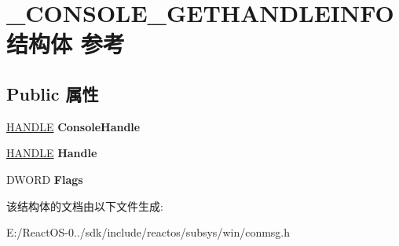 \hypertarget{struct___c_o_n_s_o_l_e___g_e_t_h_a_n_d_l_e_i_n_f_o}{}\section{\+\_\+\+C\+O\+N\+S\+O\+L\+E\+\_\+\+G\+E\+T\+H\+A\+N\+D\+L\+E\+I\+N\+F\+O结构体 参考}
\label{struct___c_o_n_s_o_l_e___g_e_t_h_a_n_d_l_e_i_n_f_o}
\subsection*{Public 属性}
\begin{DoxyCompactItemize}
\item 
\mbox{\label{struct___c_o_n_s_o_l_e___g_e_t_h_a_n_d_l_e_i_n_f_o_a83f7977c98e7216a0fd11a92f5338284}} 
\hyperlink{interfacevoid}{H\+A\+N\+D\+LE} {\bfseries Console\+Handle}
\item 
\mbox{\label{struct___c_o_n_s_o_l_e___g_e_t_h_a_n_d_l_e_i_n_f_o_ab56e1cc0d7c652efbc11b1630f6f4ef1}} 
\hyperlink{interfacevoid}{H\+A\+N\+D\+LE} {\bfseries Handle}
\item 
\mbox{\label{struct___c_o_n_s_o_l_e___g_e_t_h_a_n_d_l_e_i_n_f_o_a5e3f72ecb9994a37b718e4387ab2e75b}} 
D\+W\+O\+RD {\bfseries Flags}
\end{DoxyCompactItemize}


该结构体的文档由以下文件生成\+:\begin{DoxyCompactItemize}
\item 
E\+:/\+React\+O\+S-\/0../sdk/include/reactos/subsys/win/conmsg.\+h\end{DoxyCompactItemize}
